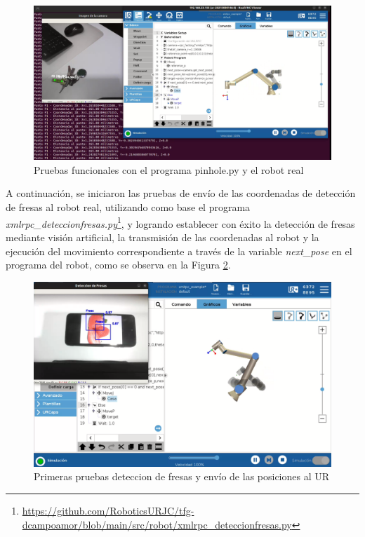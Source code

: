     \begin{figure}[H]
     \centering
     \begin{center}
       \includegraphics[width=130mm]{figs/Programa robot posetrans UR10e.png}
     \end{center}
     \caption{Pruebas funcionales con el programa pinhole.py y el robot real}
     \label{fig:pinhole_UR}
  \end{figure}

A continuación, se iniciaron las pruebas de envío de las coordenadas de detección de fresas al robot real, utilizando como base el programa \textit{xmlrpc\_deteccionfresas.py}\footnote{\url{https://github.com/RoboticsURJC/tfg-dcampoamor/blob/main/src/robot/xmlrpc_deteccionfresas.py}}, y logrando establecer con éxito la detección de fresas mediante visión artificial, la transmisión de las coordenadas al robot y la ejecución del movimiento correspondiente a través de la variable \textit{next\_pose} en el programa del robot, como se observa en la Figura \ref{fig:primeraspruebas_fresas_UR}.

  \begin{figure}[H]
     \centering
     \begin{center}
       \includegraphics[width=130mm]{figs/Primeras pruebas deteccion de fresas y envio de posiciones a UR.png}
     \end{center}
     \caption{Primeras pruebas deteccion de fresas y envío de las posiciones al UR}
     \label{fig:primeraspruebas_fresas_UR}
  \end{figure}

